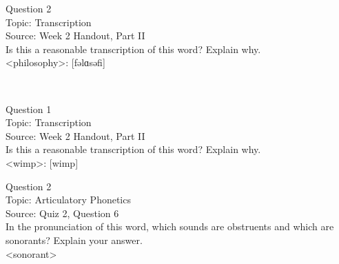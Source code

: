\documentclass[12pt]{article}
\begin{document}
\newpage

{\large Question 2}\\

Topic: Transcription\\
Source: Week 2 Handout, Part II\\

Is this a reasonable transcription of this word? Explain why.\\

<philosophy>: {[fəlɑsəfi]}


\newpage

\begin{center}
\textbf{{\color{red}{\HUGE END OF EXAM}}}\\

\end{center}
\newpage

\begin{center}
\textbf{{\color{blue}{\HUGE START OF EXAM\\}}}

\textbf{{\color{blue}{\HUGE Student ID: 74752\\}}}

\textbf{{\color{blue}{\HUGE 4:10\\}}}

\end{center}
\newpage

{\large Question 1}\\

Topic: Transcription\\
Source: Week 2 Handout, Part II\\

Is this a reasonable transcription of this word? Explain why.\\

<wimp>: {[wimp]}


\newpage

{\large Question 2}\\

Topic: Articulatory Phonetics\\
Source: Quiz 2, Question 6\\

In the pronunciation of this word, which sounds are obstruents and which are sonorants? Explain your answer.\\

<sonorant>


\newpage

\begin{center}
\textbf{{\color{red}{\HUGE END OF EXAM}}}\\

\end{center}
\newpage
\end{document}
